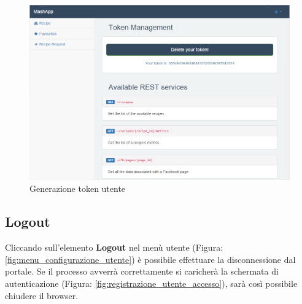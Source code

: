 		\begin{figure}[H]
			\centering
			\centerline{\includegraphics[width=14cm]{images/token_generate.png}}
			\caption{Generazione token utente}
			\label{fig:token_generate}
		\end{figure}


	\subsection{Logout} %
	\label{sec:logout}
		Cliccando sull'elemento \textbf{Logout}\gloss{} nel menù utente (Figura: \ref{fig:menu_configurazione_utente}) è possibile effettuare la disconnessione dal portale.\newline
		Se il processo avverrà correttamente si caricherà la schermata di autenticazione\gloss{} (Figura: \ref{fig:registrazione_utente_accesso}), sarà così possibile chiudere il browser\gloss{}.		


